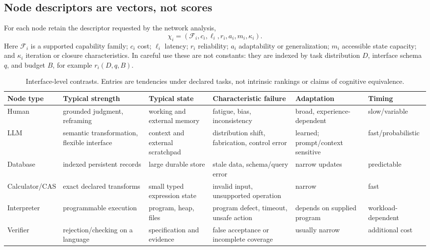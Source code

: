 \documentclass[10pt]{article}
\begin{document}
\subsection{Node descriptors are vectors, not scores}

For each node retain the descriptor requested by the network analysis,
\[
\chi_i=(\mathcal F_i,c_i,\ell_i,r_i,a_i,m_i,\kappa_i).
\]
Here $\mathcal F_i$ is a supported capability family; $c_i$ cost; $\ell_i$ latency; $r_i$ reliability; $a_i$ adaptability or generalization; $m_i$ accessible state capacity; and $\kappa_i$ iteration or closure characteristics. In careful use these are not constants: they are indexed by task distribution $D$, interface schema $q$, and budget $B$, for example $r_i(D,q,B)$.

\begin{table}[H]
\centering\small
\setlength{\tabcolsep}{5pt}
\begin{tabularx}{\linewidth}{>{\raggedright\arraybackslash}p{.13\linewidth}YYYYY}
\toprule
Node type & Typical strength & Typical state & Characteristic failure & Adaptation & Timing\\
\midrule
Human & grounded judgment, reframing & working and external memory & fatigue, bias, inconsistency & broad, experience-dependent & slow/variable\\
LLM & semantic transformation, flexible interface & context and external scratchpad & distribution shift, fabrication, control error & learned; prompt/context sensitive & fast/probabilistic\\
Database & indexed persistent records & large durable store & stale data, schema/query error & narrow updates & predictable\\
Calculator/CAS & exact declared transforms & small typed expression state & invalid input, unsupported operation & narrow & fast\\
Interpreter & programmable execution & program, heap, files & program defect, timeout, unsafe action & depends on supplied program & workload-dependent\\
Verifier & rejection/checking on a language & specification and evidence & false acceptance or incomplete coverage & usually narrow & additional cost\\
\bottomrule
\end{tabularx}
\caption{Interface-level contrasts. Entries are tendencies under declared tasks, not intrinsic rankings or claims of cognitive equivalence.}
\label{tab:nodes}
\end{table}
\end{document}
